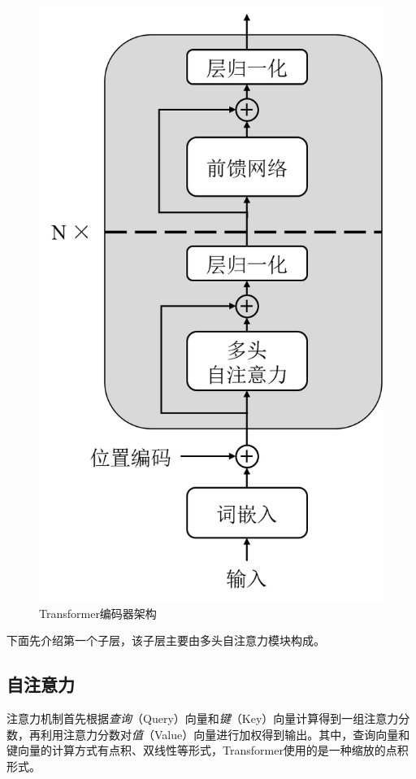 \begin{figure}[htb]
	\centering
	\includegraphics[scale=0.55]{tf.png}
	\caption{Transformer编码器架构}
	\label{fig:tf_encoder}
\end{figure}

下面先介绍第一个子层，该子层主要由多头自注意力模块构成。

\subsection{自注意力}
注意力机制首先根据\emph{查询}（Query）向量和\emph{键}（Key）向量计算得到一组注意力分数，再利用注意力分数对\emph{值}（Value）向量进行加权得到输出。其中，查询向量和键向量的计算方式有点积、双线性等形式，Transformer使用的是一种缩放的点积形式。

